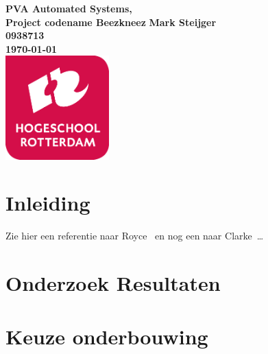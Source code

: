 \documentclass{article}
\begin{document}
\sffamily
\begin{titlepage}
  \centering
    \vfill
    {\bfseries\Huge
      PVA Automated Systems, \\
      Project codename Beezkneez
        \vskip2cm
      }
      {\bfseries\Large
        Mark Steijger\\
      }
      {
        \bfseries\normalsize
        0938713\\
        \vskip1cm
        \today\\
    }
    \vfill
    \includegraphics[width=4cm]{logohr.png} %
    \vfill
    \vfill
\end{titlepage}
\newpage
\tableofcontents

\newpage
\section{Inleiding}
Zie hier een referentie naar Royce~\cite{royce1987managing} en nog een naar Clarke~\cite{modelchecking}\ldots

\newpage
\section{Onderzoek Resultaten}




\newpage
\section{Keuze onderbouwing}





\newpage


\end{document}
